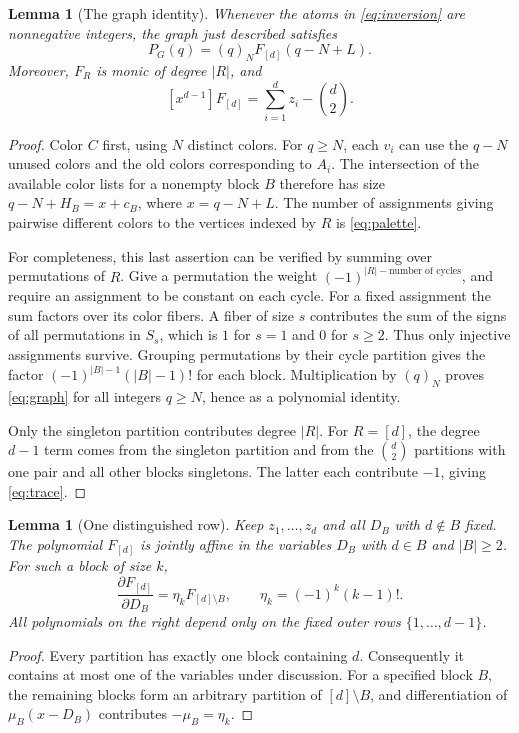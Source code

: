 \documentclass[11pt,a4paper]{article}
\newtheorem{lemma}[theorem]{Lemma}
\theoremstyle{definition}
\newcommand{\fall}[2]{(#1)_{#2}}
\begin{document}
\begin{lemma}[The graph identity]\label{lem:graph}
Whenever the atoms in \eqref{eq:inversion} are nonnegative integers,
the graph just described satisfies
\begin{equation}\label{eq:graph}
 P_G(q)=\fall qN F_{[d]}(q-N+L).
\end{equation}
Moreover, $F_R$ is monic of degree $|R|$, and
\begin{equation}\label{eq:trace}
 [x^{d-1}]F_{[d]}=\sum_{i=1}^d z_i-\binom d2.
\end{equation}
\end{lemma}
\begin{proof}
Color $C$ first, using $N$ distinct colors. For $q\ge N$, each $v_i$
can use the $q-N$ unused colors and the old colors corresponding to
$A_i$. The intersection of the available color lists for a nonempty
block $B$ therefore has size $q-N+H_B=x+c_B$, where $x=q-N+L$.
The number of assignments giving pairwise different colors to the
vertices indexed by $R$ is \eqref{eq:palette}.

For completeness, this last assertion can be verified by summing over
permutations of $R$. Give a permutation the weight
$(-1)^{|R|-\text{number of cycles}}$, and require an assignment to be
constant on each cycle. For a fixed assignment the sum factors over its
color fibers. A fiber of size $s$ contributes the sum of the signs of
all permutations in $S_s$, which is $1$ for $s=1$ and $0$ for $s\ge2$.
Thus only injective assignments survive. Grouping permutations by their
cycle partition gives the factor $(-1)^{|B|-1}(|B|-1)!$ for each block.
Multiplication by $\fall qN$ proves \eqref{eq:graph} for all integers
$q\ge N$, hence as a polynomial identity.

Only the singleton partition contributes degree $|R|$. For
$R=[d]$, the degree $d-1$ term comes from the singleton partition
and from the $\binom d2$ partitions with one pair and all other blocks
singletons. The latter each contribute $-1$, giving \eqref{eq:trace}.
\end{proof}

\begin{lemma}[One distinguished row]\label{lem:affine}
Keep $z_1,\ldots,z_d$ and all $D_B$ with $d\notin B$ fixed.
The polynomial $F_{[d]}$ is jointly affine in the variables
$D_B$ with $d\in B$ and $|B|\ge2$. For such a block of size $k$,
\begin{equation}\label{eq:derivative}
 \frac{\partial F_{[d]}}{\partial D_B}
   =\eta_k F_{[d]\setminus B},\qquad
 \eta_k=(-1)^k(k-1)!.
\end{equation}
All polynomials on the right depend only on the fixed outer rows
$\{1,\ldots,d-1\}$.
\end{lemma}
\begin{proof}
Every partition has exactly one block containing $d$.
Consequently it contains at most one of the variables under discussion.
For a specified block $B$, the remaining blocks form an arbitrary
partition of $[d]\setminus B$, and differentiation of
$\mu_B(x-D_B)$ contributes $-\mu_B=\eta_k$.
\end{proof}
\end{document}
